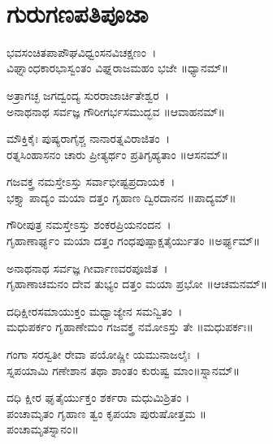 ‌\chapter*{\center ಗುರುಗಣಪತಿಪೂಜಾ}
\thispagestyle{empty}
ಭವಸಂಚಿತಪಾಪೌಘವಿಧ್ವಂಸನವಿಚಕ್ಷಣಂ~।\\
ವಿಘ್ನಾಂಧಕಾರಭಾಸ್ವಂತಂ ವಿಘ್ನರಾಜಮಹಂ ಭಜೇ ॥ಧ್ಯಾನಮ್॥

ಅತ್ರಾಗಚ್ಛ ಜಗದ್ವಂದ್ಯ ಸುರರಾಜಾರ್ಚಿತೇಶ್ವರ~।\\
ಅನಾಥನಾಥ ಸರ್ವಜ್ಞ ಗೌರೀಗರ್ಭಸಮುದ್ಭವ ॥ಆವಾಹನಮ್॥

ಮೌಕ್ತಿಕೈಃ ಪುಷ್ಯರಾಗೈಶ್ಚ ನಾನಾರತ್ನವಿರಾಜಿತಂ~।\\
ರತ್ನಸಿಂಹಾಸನಂ ಚಾರು ಪ್ರೀತ್ಯರ್ಥಂ ಪ್ರತಿಗೃಹ್ಯತಾಂ ॥ಆಸನಮ್॥

ಗಜವಕ್ತ್ರ ನಮಸ್ತೇಽಸ್ತು ಸರ್ವಾಭೀಷ್ಟಪ್ರದಾಯಕ~।\\
ಭಕ್ತ್ಯಾ ಪಾದ್ಯಂ ಮಯಾ ದತ್ತಂ ಗೃಹಾಣ ದ್ವಿರದಾನನ ॥ಪಾದ್ಯಮ್॥

ಗೌರೀಪುತ್ರ ನಮಸ್ತೇಽಸ್ತು ಶಂಕರಪ್ರಿಯನಂದನ~।\\
ಗೃಹಾಣಾರ್ಘ್ಯಂ ಮಯಾ ದತ್ತಂ ಗಂಧಪುಷ್ಪಾಕ್ಷತೈರ್ಯುತಂ ॥ಅರ್ಘ್ಯಮ್॥

ಅನಾಥನಾಥ ಸರ್ವಜ್ಞ ಗೀರ್ವಾಣವರಪೂಜಿತ~।\\
ಗೃಹಾಣಾಚಮನಂ ದೇವ ತುಭ್ಯಂ ದತ್ತಂ ಮಯಾ ಪ್ರಭೋ ॥ಆಚಮನಮ್॥

ದಧಿಕ್ಷೀರಸಮಾಯುಕ್ತಂ ಮಧ್ವಾಜ್ಯೇನ ಸಮನ್ವಿತಂ~।\\
ಮಧುಪರ್ಕಂ ಗೃಹಾಣೇಮಂ ಗಜವಕ್ತ್ರ ನಮೋಽಸ್ತು ತೇ ॥ಮಧುಪರ್ಕಃ॥

ಗಂಗಾ ಸರಸ್ವತೀ ರೇವಾ ಪಯೋಷ್ಣೀ ಯಮುನಾಜಲೈಃ~।\\
ಸ್ನಪಯಾಮಿ ಗಣೇಶಾನ ತಥಾ ಶಾಂತಂ ಕುರುಷ್ವ ಮಾಂ॥ಸ್ನಾನಮ್॥

ದಧಿ ಕ್ಷೀರ ಘೃತೈರ್ಯುಕ್ತಂ ಶರ್ಕರಾ ಮಧುಮಿಶ್ರಿತಂ ।\\
ಪಂಚಾಮೃತಂ ಗೃಹಾಣ ತ್ವಂ ಕೃಪಯಾ ಪುರುಷೋತ್ತಮ ॥\\ಪಂಚಾಮೃತಸ್ನಾನಂ॥

